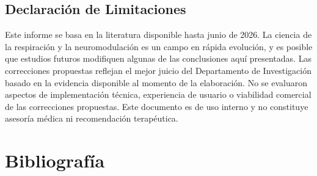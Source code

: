 \documentclass[12pt,a4paper]{article}
\begin{document}
\subsection{Declaración de Limitaciones}

Este informe se basa en la literatura disponible hasta junio de 2026. La ciencia
de la respiración y la neuromodulación es un campo en rápida evolución, y es
posible que estudios futuros modifiquen algunas de las conclusiones aquí
presentadas. Las correcciones propuestas reflejan el mejor juicio del
Departamento de Investigación basado en la evidencia disponible al momento de
la elaboración. No se evaluaron aspectos de implementación técnica, experiencia
de usuario o viabilidad comercial de las correcciones propuestas. Este
documento es de uso interno y no constituye asesoría médica ni recomendación
terapéutica.

\newpage

\section{Bibliografía}
\end{document}
